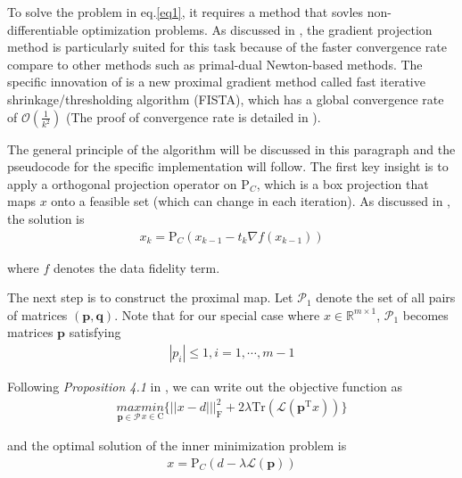 \documentclass[12pt]{article}
\newcommand{\noin}{\noindent}
\begin{document}
\noin To solve the problem in eq.\ref{eq1}, it requires a method that sovles non-differentiable optimization problems. As discussed in \cite{Beck2009-id}, the gradient projection method is particularly suited for this task because of the faster convergence rate compare to other methods such as primal-dual Newton-based methods\cite{Chan1996-mt}. The specific innovation of \cite{Beck2009-id} is a new proximal gradient method called fast iterative shrinkage/thresholding algorithm (FISTA), which has a global convergence rate of $\mathcal{O}(\frac{1}{k^2})$ (The proof of convergence rate is detailed in \cite{Beck2009-id}). 

\vspace{0.2in}

\noin The general principle of the algorithm will be discussed in this paragraph and the pseudocode for the specific implementation will follow. The first key insight is to apply a orthogonal projection operator on $\text{P}_C$, which is a box projection that maps $x$ onto a feasible set (which can change in each iteration). As discussed in \cite{Beck2009-id}, the solution is
\begin{align}
    x_k = \text{P}_C(x_{k-1} - t_k\nabla f(x_{k-1}))
\end{align}

\noin where $f$ denotes the data fidelity term.

\vspace{0.2in}

\noin The next step is to construct the proximal map. Let $\mathcal{P}_1$ denote the set of all pairs of matrices $(\mathbf{p}, \mathbf{q})$. Note that for our special case where $x \in \mathbb{R}^{m \times 1}$, $\mathcal{P}_1$ becomes matrices $\mathbf{p}$ satisfying
\begin{align}
    |p_i| \leq 1, i = 1,\cdots,m-1
\end{align}

\noin Following \emph{Proposition 4.1} in \cite{Beck2009-id}, we can write out the objective function as 
\begin{align}
\underset{\mathbf{p} \in \mathcal{P}}{max} \underset{x \in \text{C}}{min}\{||x-d|||_\text{F}^2 + 2\lambda\text{Tr}(\mathcal{L}(\mathbf{p}^{\text{T}}x))\}
\end{align}

\noin and the optimal solution of the inner minimization problem is 
\begin{align}
    x = \text{P}_C(d - \lambda \mathcal{L}(\mathbf{p}))
\end{align}
\end{document}
